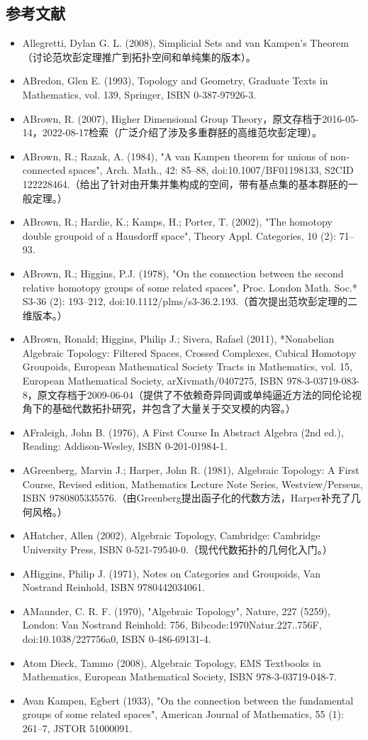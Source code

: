 \subsection{参考文献}
\begin{itemize}
\item Allegretti, Dylan G. L. (2008), Simplicial Sets and van Kampen's Theorem（讨论范坎彭定理推广到拓扑空间和单纯集的版本）。
\item ABredon, Glen E. (1993), Topology and Geometry, Graduate Texts in Mathematics, vol. 139, Springer, ISBN 0-387-97926-3.
\item ABrown, R. (2007), Higher Dimensional Group Theory，原文存档于2016-05-14，2022-08-17检索（广泛介绍了涉及多重群胚的高维范坎彭定理）。
\item ABrown, R.; Razak, A. (1984), "A van Kampen theorem for unions of non-connected spaces", Arch. Math., 42: 85–88, doi:10.1007/BF01198133, S2CID 122228464.（给出了针对由开集并集构成的空间，带有基点集的基本群胚的一般定理。）
\item ABrown, R.; Hardie, K.; Kamps, H.; Porter, T. (2002), "The homotopy double groupoid of a Hausdorff space", Theory Appl. Categories, 10 (2): 71–93.
\item ABrown, R.; Higgins, P.J. (1978), "On the connection between the second relative homotopy groups of some related spaces", Proc. London Math. Soc.* S3-36 (2): 193–212, doi:10.1112/plms/s3-36.2.193.（首次提出范坎彭定理的二维版本。）
\item ABrown, Ronald; Higgins, Philip J.; Sivera, Rafael (2011), *Nonabelian Algebraic Topology: Filtered Spaces, Crossed Complexes, Cubical Homotopy Groupoids, European Mathematical Society Tracts in Mathematics, vol. 15, European Mathematical Society, arXiv\:math/0407275, ISBN 978-3-03719-083-8，原文存档于2009-06-04（提供了不依赖奇异同调或单纯逼近方法的同伦论视角下的基础代数拓扑研究，并包含了大量关于交叉模的内容。）
\item AFraleigh, John B. (1976), A First Course In Abstract Algebra (2nd ed.), Reading: Addison-Wesley, ISBN 0-201-01984-1.
\item AGreenberg, Marvin J.; Harper, John R. (1981), Algebraic Topology: A First Course, Revised edition, Mathematics Lecture Note Series, Westview/Perseus, ISBN 9780805335576.（由Greenberg提出函子化的代数方法，Harper补充了几何风格。）
\item AHatcher, Allen (2002), Algebraic Topology, Cambridge: Cambridge University Press, ISBN 0-521-79540-0.（现代代数拓扑的几何化入门。）
\item AHiggins, Philip J. (1971), Notes on Categories and Groupoids, Van Nostrand Reinhold, ISBN 9780442034061.
\item AMaunder, C. R. F. (1970), "Algebraic Topology", Nature, 227 (5259), London: Van Nostrand Reinhold: 756, Bibcode:1970Natur.227..756F, doi:10.1038/227756a0, ISBN 0-486-69131-4.
\item Atom Dieck, Tammo (2008), Algebraic Topology, EMS Textbooks in Mathematics, European Mathematical Society, ISBN 978-3-03719-048-7.
\item Avan Kampen, Egbert (1933), "On the connection between the fundamental groups of some related spaces", American Journal of Mathematics, 55 (1): 261–7, JSTOR 51000091.
\end{itemize}
